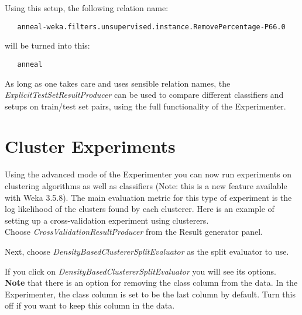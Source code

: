 Using this setup, the following relation name:
\begin{verbatim}
   anneal-weka.filters.unsupervised.instance.RemovePercentage-P66.0
\end{verbatim}
\noindent will be turned into this:
\begin{verbatim}
   anneal
\end{verbatim}

As long as one takes care and uses sensible relation names, the \textit{ExplicitTestSetResultProducer} can be used to compare different classifiers and setups on train/test set pairs, using the full functionality of the Experimenter.


\newpage
\section{Cluster Experiments}
Using the advanced mode of the Experimenter you can now run experiments on
clustering algorithms as well as classifiers (Note: this is a new feature
available with Weka 3.5.8). The main evaluation metric for this type of
experiment is the log likelihood of the clusters found by each clusterer. Here
is an example of setting up a cross-validation experiment using clusterers. \\

\noindent Choose \textit{CrossValidationResultProducer} from the Result generator panel.
\begin{center}
\end{center}

\newpage

\noindent Next, choose \textit{DensityBasedClustererSplitEvaluator} as the split evaluator
to use.
\begin{center}
\end{center}

\noindent If you click on \textit{DensityBasedClustererSplitEvaluator} you will see its
options. \\

\noindent \textbf{Note} that there is an option for removing the class column
from the data. In the Experimenter, the class column is set to be the last
column by default. Turn this off if you want to keep this column in the data.
\begin{center}
\end{center}

